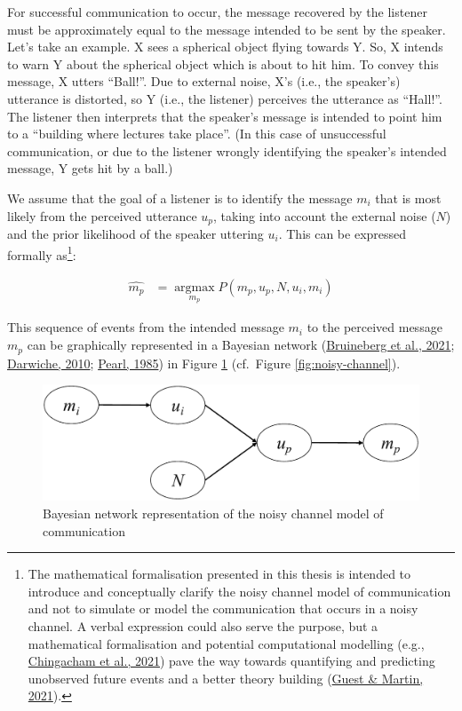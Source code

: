\documentclass[a4paper, nobind]{templates/ociamthesis}
\begin{document}
For successful communication to occur, the message recovered by the listener must be approximately equal to the message intended to be sent by the speaker.
Let's take an example.
X sees a spherical object flying towards Y.
So, X intends to warn Y about the spherical object which is about to hit him.
To convey this message, X utters ``Ball!''.
Due to external noise, X's (i.e., the speaker's) utterance is distorted, so Y (i.e., the listener) perceives the utterance as ``Hall!''.
The listener then interprets that the speaker's message is intended to point him to a ``building where lectures take place''.
(In this case of unsuccessful communication, or due to the listener wrongly identifying the speaker's intended message, Y gets hit by a ball.)

We assume that the goal of a listener is to identify the message \(m_i\) that is most likely from the perceived utterance \(u_p\), taking into account the external noise (\(N\)) and the prior likelihood of the speaker uttering \(u_i\).
This can be expressed formally as\footnote{The mathematical formalisation presented in this thesis is intended to introduce and conceptually clarify the noisy channel model of communication and not to simulate or model the communication that occurs in a noisy channel.
  A verbal expression could also serve the purpose, but a mathematical formalisation and potential computational modelling (e.g., \protect\hyperlink{ref-Chingacham2021}{Chingacham et al., 2021}) pave the way towards quantifying and predicting unobserved future events and a better theory building (\protect\hyperlink{ref-Guest2020}{Guest \& Martin, 2021}).
}:

\begin{align} \label{eq:noisy-channel2}
\hat{m_p} &= \mathop{\mathrm{argmax}}\limits_{m_p} P(m_p,u_p,N,u_i,m_i)
\end{align}

This sequence of events from the intended message \(m_i\) to the perceived message \(m_p\) can be graphically represented in a Bayesian network (\protect\hyperlink{ref-Bruineberg2021}{Bruineberg et al., 2021}; \protect\hyperlink{ref-Darwiche2010}{Darwiche, 2010}; \protect\hyperlink{ref-Pearl1985}{Pearl, 1985}) in Figure \ref{fig:bayesian-network} (cf.~Figure \ref{fig:noisy-channel}).

\begin{figure}[!htpb]

{\centering \includegraphics[width=0.9\linewidth]{figures/materials/bayesian-network} 

}

\caption{Bayesian network representation of the noisy channel model of communication}\label{fig:bayesian-network}
\end{figure}
\end{document}
